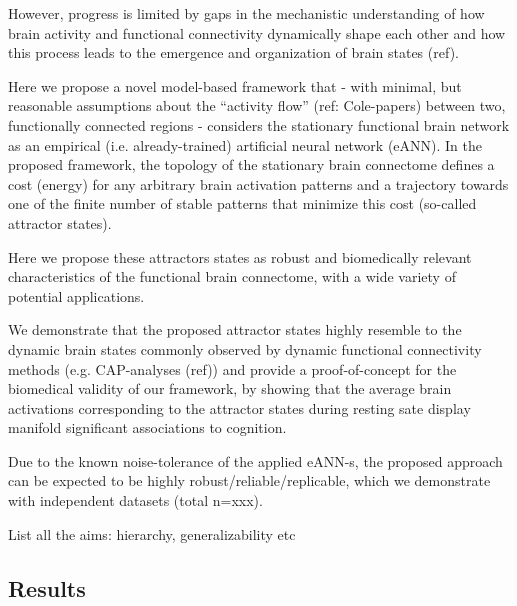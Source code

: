 \documentclass[twocolumn, switch]{article}
\begin{document}
However, progress is limited by gaps in the mechanistic understanding of how brain activity and functional connectivity dynamically shape each other and how this process leads to the emergence and organization of brain states (ref).

Here we propose a novel model-based framework that - with minimal, but reasonable assumptions about the ``activity flow'' (ref: Cole-papers) between two, functionally connected regions - considers the stationary functional brain network as an empirical (i.e. already-trained) artificial neural network (eANN). In the proposed framework, the topology of the stationary brain connectome defines a cost (energy) for any arbitrary brain activation patterns and a trajectory towards one of the finite number of stable patterns that minimize this cost (so-called attractor states).

Here we propose these attractors states as robust and biomedically relevant characteristics of the functional brain connectome, with a wide variety of potential applications.

We demonstrate that the proposed attractor states highly resemble to the dynamic brain states commonly observed by dynamic functional connectivity methods (e.g. CAP-analyses (ref)) and provide a proof-of-concept for the biomedical validity of our framework, by showing that the average brain activations corresponding to the attractor states during resting sate display manifold significant associations to cognition.

Due to the known noise-tolerance of the applied eANN-s, the proposed approach can be expected to be highly robust/reliable/replicable, which we demonstrate with independent datasets (total n=xxx).

List all the aims: hierarchy, generalizability etc

\subsection{Results}\label{Results}
\end{document}
